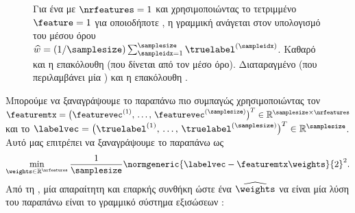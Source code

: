 {{\begin{figure}[H]
		{
		 \caption{\foreignlanguage{greek}{Για ένα}  \foreignlanguage{greek}{με $\nrfeatures=1$ και χρησιμοποιώντας 
		 	το τετριμμένο}  $\feature=1$ \foreignlanguage{greek}{για οποιοδήποτε} , 
		 	\foreignlanguage{greek}{η γραμμική}  \foreignlanguage{greek}{ανάγεται στον υπολογισμό του μέσου 
			όρου} $\widehat{w} = (1/\samplesize) \sum_{\sampleidx=1}^{\samplesize} \truelabel^{(\sampleidx)}$. 
			 \foreignlanguage{greek}{Καθαρό}  \foreignlanguage{greek}{και η επακόλουθη} 
			 \foreignlanguage{greek}{(που δίνεται από τον μέσο όρο}).  
			\foreignlanguage{greek}{Διαταραγμένο}  (\foreignlanguage{greek}{που περιλαμβάνει μία} 
			) \foreignlanguage{greek}{και η επακόλουθη} . \label{fig_linreg_dict}} }
		\end{figure}
		\foreignlanguage{greek}{Μπορούμε να ξαναγράψουμε το παραπάνω}  \foreignlanguage{greek}{πιο 
		συμπαγώς χρησιμοποιώντας τον}  
		$\featuremtx = \big(\featurevec^{(1)},\,\ldots,\,\featurevec^{(\samplesize)}\big)^{T} \in \mathbb{R}^{\samplesize \times \nrfeatures}$ 
		\foreignlanguage{greek}{και το}  
		$\labelvec = \big( \truelabel^{(1)},\,\ldots, \,\truelabel^{(\samplesize)} \big)^{T} \in \mathbb{R}^{\samplesize}$. 
		\foreignlanguage{greek}{Αυτό μας επιτρέπει να ξαναγράψουμε το παραπάνω}  \foreignlanguage{greek}{ως}
		$$\min_{\weights \in \mathbb{R}^{\nrfeatures}} \frac{1}{\samplesize} \normgeneric{\labelvec - \featuremtx \weights}{2}^{2}.$$
		\foreignlanguage{greek}{Από τη} , \foreignlanguage{greek}{μία απαραίτητη και επαρκής συνθήκη 
		ώστε ένα}  $\widehat{\weights}$ \foreignlanguage{greek}{να είναι μία λύση του παραπάνω} 
		 \foreignlanguage{greek}{είναι το γραμμικό σύστημα εξισώσεων} \cite{StrangLinAlg2016}:
		\begin{equation} 
			\label{eq_linreg_normal_eq_dict}

\end{equation}}}
